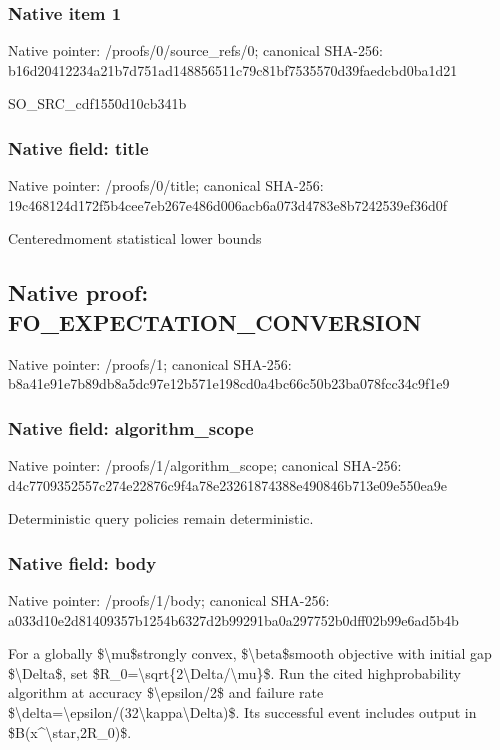 \documentclass[10pt,a4paper]{article}
\begin{document}
\subsubsection{Native item 1}


Native pointer: /proofs/0/source\_refs/0; canonical SHA-256: b16d20412234a21b7d751ad1\allowbreak{}48856511c79c81bf7535570d\allowbreak{}39faedcbd0ba1d21


SO\_SRC\_cdf1550d10cb341b


\subsubsection{Native field: title}


Native pointer: /proofs/0/title; canonical SHA-256: 19c468124d172f5b4cee7eb2\allowbreak{}67e486d006acb6a073d4783e\allowbreak{}8b7242539ef36d0f


Centeredmoment statistical lower bounds


\subsection{Native proof: FO\_EXPECTATION\_CONVERSION}


Native pointer: /proofs/1; canonical SHA-256: b8a41e91e7b89db8a5dc97e1\allowbreak{}2b571e198cd0a4bc66c50b23\allowbreak{}ba078fcc34c9f1e9



\subsubsection{Native field: algorithm\_scope}


Native pointer: /proofs/1/algorithm\_scope; canonical SHA-256: d4c7709352557c274e22876c\allowbreak{}9f4a78e23261874388e49084\allowbreak{}6b713e09e550ea9e


Deterministic query policies remain deterministic.


\subsubsection{Native field: body}


Native pointer: /proofs/1/body; canonical SHA-256: a033d10e2d81409357b1254b\allowbreak{}6327d2b99291ba0a297752b0\allowbreak{}dff02b99e6ad5b4b


For a globally \$\textbackslash{}mu\$strongly convex, \$\textbackslash{}beta\$smooth objective with initial gap \$\textbackslash{}Delta\$, set \$R\_0=\textbackslash{}sqrt\{2\textbackslash{}Delta/\textbackslash{}mu\}\$. Run the cited highprobability algorithm at accuracy \$\textbackslash{}epsilon/2\$ and failure rate \$\textbackslash{}delta=\textbackslash{}epsilon/(32\textbackslash{}kappa\textbackslash{}Delta)\$. Its successful event includes output in \$B(x\textasciicircum{}\textbackslash{}star,2R\_0)\$.
\end{document}
